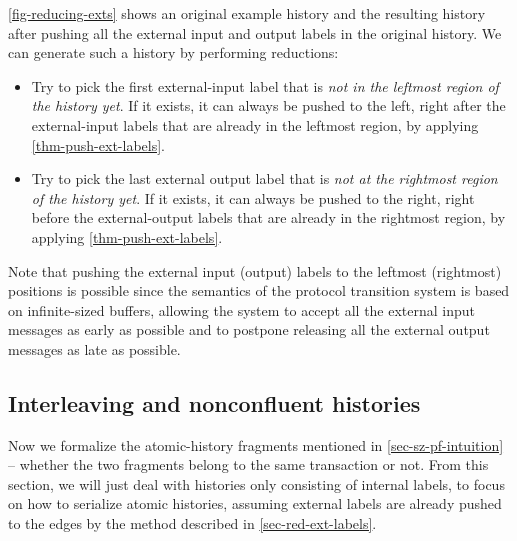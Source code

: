 \autoref{fig-reducing-exts} shows an original example history and the resulting history after pushing all the external input and output labels in the original history.
We can generate such a history by performing reductions:
\begin{itemize}
\item Try to pick the first external-input label that is \emph{not in the leftmost region of the history yet}. If it exists, it can always be pushed to the left, right after the external-input labels that are already in the leftmost region, by applying \autoref{thm-push-ext-labels}.
\item Try to pick the last external output label that is \emph{not at the rightmost region of the history yet}. If it exists, it can always be pushed to the right, right before the external-output labels that are already in the rightmost region, by applying \autoref{thm-push-ext-labels}.
\end{itemize}
Note that pushing the external input (output) labels to the leftmost (rightmost) positions is possible since the semantics of the protocol transition system is based on infinite-sized buffers, allowing the system to accept all the external input messages as early as possible and to postpone releasing all the external output messages as late as possible.

\subsection{Interleaving and nonconfluent histories}
\label{sec-itlv-ncf-hst}

Now we formalize the atomic-history fragments mentioned in \autoref{sec-sz-pf-intuition} -- whether the two fragments belong to the same transaction or not.
From this section, we will just deal with histories only consisting of internal labels, to focus on how to serialize atomic histories, assuming external labels are already pushed to the edges by the method described in \autoref{sec-red-ext-labels}.

